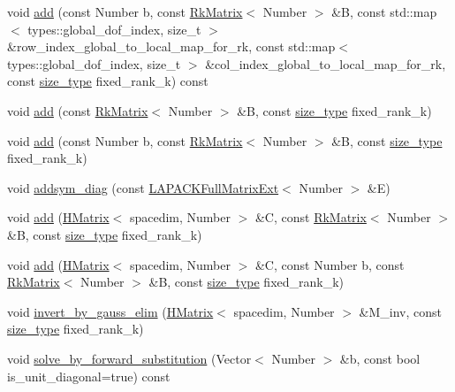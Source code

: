 \begin{DoxyCompactItemize}
void \hyperlink{classHMatrix_ad3800d6fded523d5c8eeb8fd0c106a34}{add} (const Number b, const \hyperlink{classRkMatrix}{Rk\+Matrix}$<$ Number $>$ \&B, const std\+::map$<$ types\+::global\+\_\+dof\+\_\+index, size\+\_\+t $>$ \&row\+\_\+index\+\_\+global\+\_\+to\+\_\+local\+\_\+map\+\_\+for\+\_\+rk, const std\+::map$<$ types\+::global\+\_\+dof\+\_\+index, size\+\_\+t $>$ \&col\+\_\+index\+\_\+global\+\_\+to\+\_\+local\+\_\+map\+\_\+for\+\_\+rk, const \hyperlink{classHMatrix_a5ca8dc549783d38371a01ecd621ecb34}{size\+\_\+type} fixed\+\_\+rank\+\_\+k) const
\item 
void \hyperlink{classHMatrix_ab9000d7604e2045cf7cad7458daca340}{add} (const \hyperlink{classRkMatrix}{Rk\+Matrix}$<$ Number $>$ \&B, const \hyperlink{classHMatrix_a5ca8dc549783d38371a01ecd621ecb34}{size\+\_\+type} fixed\+\_\+rank\+\_\+k)
\item 
void \hyperlink{classHMatrix_a94981e45b7d9aa0f2afae77d414f1c1a}{add} (const Number b, const \hyperlink{classRkMatrix}{Rk\+Matrix}$<$ Number $>$ \&B, const \hyperlink{classHMatrix_a5ca8dc549783d38371a01ecd621ecb34}{size\+\_\+type} fixed\+\_\+rank\+\_\+k)
\item 
void \hyperlink{classHMatrix_ac72668962dbad336f0c289bbd060e6ce}{addsym\+\_\+diag} (const \hyperlink{classLAPACKFullMatrixExt}{L\+A\+P\+A\+C\+K\+Full\+Matrix\+Ext}$<$ Number $>$ \&E)
\item 
void \hyperlink{classHMatrix_a403d72a5eea3912d67fd0807ddd0baf8}{add} (\hyperlink{classHMatrix}{H\+Matrix}$<$ spacedim, Number $>$ \&C, const \hyperlink{classRkMatrix}{Rk\+Matrix}$<$ Number $>$ \&B, const \hyperlink{classHMatrix_a5ca8dc549783d38371a01ecd621ecb34}{size\+\_\+type} fixed\+\_\+rank\+\_\+k)
\item 
void \hyperlink{classHMatrix_af66071b53145fe007ac040fa0c4b47c6}{add} (\hyperlink{classHMatrix}{H\+Matrix}$<$ spacedim, Number $>$ \&C, const Number b, const \hyperlink{classRkMatrix}{Rk\+Matrix}$<$ Number $>$ \&B, const \hyperlink{classHMatrix_a5ca8dc549783d38371a01ecd621ecb34}{size\+\_\+type} fixed\+\_\+rank\+\_\+k)
\item 
void \hyperlink{classHMatrix_af972cb62d436b8dca5d95a5b6e2ed964}{invert\+\_\+by\+\_\+gauss\+\_\+elim} (\hyperlink{classHMatrix}{H\+Matrix}$<$ spacedim, Number $>$ \&M\+\_\+inv, const \hyperlink{classHMatrix_a5ca8dc549783d38371a01ecd621ecb34}{size\+\_\+type} fixed\+\_\+rank\+\_\+k)
\item 
void \hyperlink{classHMatrix_aeee2443c3f85cd6a961e77e5287e43f9}{solve\+\_\+by\+\_\+forward\+\_\+substitution} (Vector$<$ Number $>$ \&b, const bool is\+\_\+unit\+\_\+diagonal=true) const

\end{DoxyCompactItemize}
